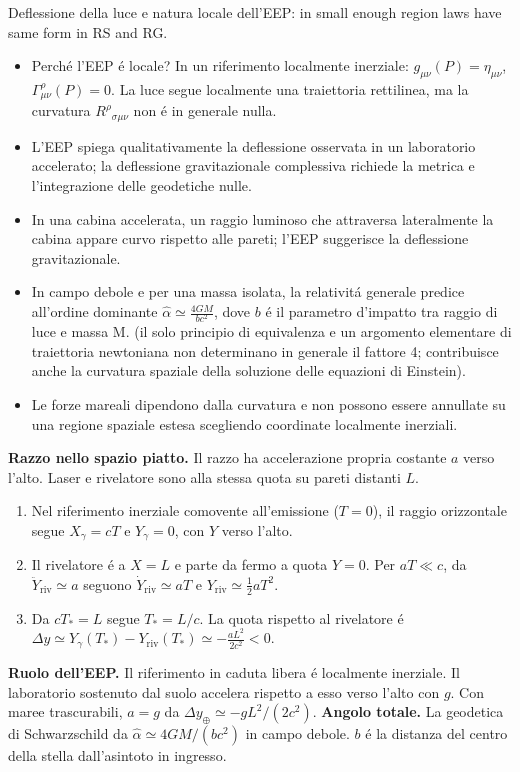 \begin{frame}[t]{Deflessione della luce e natura locale dell'EEP: \small in small enough region laws have same form in RS and RG.}\small\raggedright
\begin{itemize}
\item Perch\'e l'EEP \'e locale? In un riferimento localmente inerziale: $g_{\mu\nu}(P)=\eta_{\mu\nu}$, $\Gamma^\rho_{\mu\nu}(P)=0$. La luce segue localmente una traiettoria rettilinea, ma la curvatura $R^\rho{}_{\sigma\mu\nu}$ non \'e in generale nulla.
\item L'EEP spiega qualitativamente la deflessione osservata in un laboratorio accelerato; la deflessione gravitazionale complessiva richiede la metrica e l'integrazione delle geodetiche nulle.
\item In una cabina accelerata, un raggio luminoso che attraversa lateralmente la cabina appare curvo rispetto alle pareti; l'EEP suggerisce la deflessione gravitazionale.
\item In campo debole e per una  massa isolata, la relativit\'a generale predice all'ordine dominante $\widehat\alpha\simeq\frac{4GM}{bc^2}$, dove $b$ \'e il parametro d'impatto tra raggio di luce e massa M. (il solo principio di equivalenza e un argomento elementare di traiettoria newtoniana non determinano in generale il fattore 4; contribuisce anche la curvatura spaziale della soluzione delle equazioni di Einstein).
\item Le forze mareali dipendono dalla curvatura e non possono essere annullate su una regione spaziale estesa scegliendo coordinate localmente inerziali.
\end{itemize}
\small\raggedright
\textbf{Razzo nello spazio piatto.} Il razzo ha accelerazione propria costante \(a\) verso l'alto. Laser e rivelatore sono alla stessa quota su pareti distanti \(L\).
\begin{enumerate}
    \item Nel riferimento inerziale comovente all'emissione (\(T=0\)), il raggio orizzontale segue \(X_\gamma=cT\) e \(Y_\gamma=0\), con \(Y\) verso l'alto.
    \item Il rivelatore \'e a \(X=L\) e parte da fermo a quota \(Y=0\). Per \(aT\ll c\), da \(\ddot Y_{\mathrm{riv}}\simeq a\) seguono \(\dot Y_{\mathrm{riv}}\simeq aT\) e \(Y_{\mathrm{riv}}\simeq \tfrac{1}{2}aT^2\).
    \item Da \(cT_*=L\) segue \(T_*=L/c\). La quota rispetto al rivelatore \'e $\Delta y\simeq Y_\gamma(T_*)-Y_{\mathrm{riv}}(T_*)\simeq -\frac{aL^2}{2c^2}<0$.
\end{enumerate}
\textbf{Ruolo dell'EEP.} Il riferimento in caduta libera \'e localmente inerziale. Il laboratorio sostenuto dal suolo accelera rispetto a esso verso l'alto con \(g\). Con maree trascurabili, \(a=g\) da \(\Delta y_\oplus\simeq-gL^2/(2c^2)\).
\textbf{Angolo totale.} La geodetica di Schwarzschild da \(\widehat{\alpha}\simeq 4GM/(bc^2)\) in campo debole. \(b\) \'e la distanza del centro della stella dall'asintoto in ingresso.
\end{frame}

